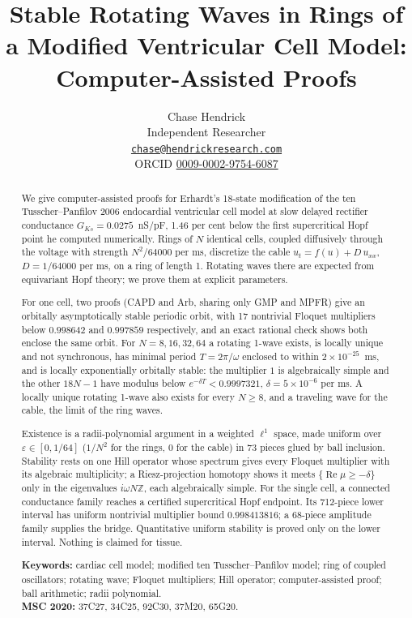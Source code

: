 \documentclass[11pt]{article}
\title{\Large\bfseries Stable Rotating Waves in Rings of a Modified Ventricular Cell Model:\\ Computer-Assisted Proofs}
\author{Chase Hendrick\\[0.2em] {\small Independent Researcher}\\ {\small\href{mailto:chase@hendrickresearch.com}{\texttt{chase@hendrickresearch.com}}}\\ {\small ORCID \href{https://orcid.org/0009-0002-9754-6087}{0009-0002-9754-6087}}}
\date{}
\theoremstyle{definition}
\newcommand{\Z}{\mathbb{Z}}
\newcommand{\re}{\operatorname{Re}}
\begin{document}
\maketitle

\begin{abstract}
We give computer-assisted proofs for Erhardt's 18-state modification of the ten Tusscher--Panfilov 2006 endocardial ventricular cell model at slow delayed rectifier conductance $G_{Ks} = 0.0275$~nS/pF, 1.46 per cent below the first supercritical Hopf point he computed numerically. Rings of $N$ identical cells, coupled diffusively through the voltage with strength $N^2/64000$ per ms, discretize the cable $u_t = f(u) + D\,u_{xx}$, $D = 1/64000$ per ms, on a ring of length 1. Rotating waves there are expected from equivariant Hopf theory; we prove them at explicit parameters.

For one cell, two proofs (CAPD and Arb, sharing only GMP and MPFR) give an orbitally asymptotically stable periodic orbit, with 17 nontrivial Floquet multipliers below $0.998642$ and $0.997859$ respectively, and an exact rational check shows both enclose the same orbit. For $N = 8, 16, 32, 64$ a rotating 1-wave exists, is locally unique and not synchronous, has minimal period $T = 2\pi/\omega$ enclosed to within $2 \times 10^{-25}$~ms, and is locally exponentially orbitally stable: the multiplier $1$ is algebraically simple and the other $18N - 1$ have modulus below $e^{-\delta T} < 0.9997321$, $\delta = 5 \times 10^{-6}$ per ms. A locally unique rotating 1-wave also exists for every $N \ge 8$, and a traveling wave for the cable, the limit of the ring waves.

Existence is a radii-polynomial argument in a weighted $\ell^1$ space, made uniform over $\varepsilon \in [0, 1/64]$ ($1/N^2$ for the rings, $0$ for the cable) in 73 pieces glued by ball inclusion. Stability rests on one Hill operator whose spectrum gives every Floquet multiplier with its algebraic multiplicity; a Riesz-projection homotopy shows it meets $\{\re\mu \ge -\delta\}$ only in the eigenvalues $i\omega N\Z$, each algebraically simple. For the single cell, a connected conductance family reaches a certified supercritical Hopf endpoint. Its 712-piece lower interval has uniform nontrivial multiplier bound $0.998413816$; a 68-piece amplitude family supplies the bridge. Quantitative uniform stability is proved only on the lower interval. Nothing is claimed for tissue.

\medskip
\noindent\textbf{Keywords:} cardiac cell model; modified ten Tusscher--Panfilov model; ring of coupled oscillators; rotating wave; Floquet multipliers; Hill operator; computer-assisted proof; ball arithmetic; radii polynomial.\\
\textbf{MSC 2020:} 37C27, 34C25, 92C30, 37M20, 65G20.
\end{abstract}
\end{document}
